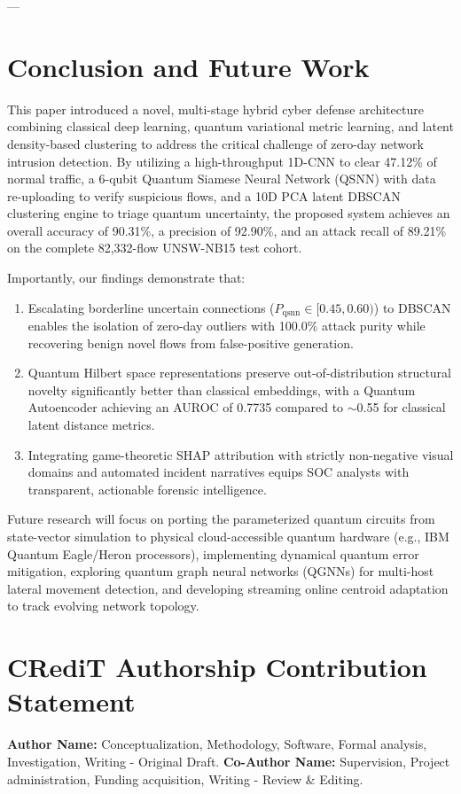 \documentclass[preprint,12pt]{elsarticle}
\begin{document}
---

\section{Conclusion and Future Work}
\label{sec:conclusion}

This paper introduced a novel, multi-stage hybrid cyber defense architecture combining classical deep learning, quantum variational metric learning, and latent density-based clustering to address the critical challenge of zero-day network intrusion detection. By utilizing a high-throughput 1D-CNN to clear 47.12\% of normal traffic, a 6-qubit Quantum Siamese Neural Network (QSNN) with data re-uploading to verify suspicious flows, and a 10D PCA latent DBSCAN clustering engine to triage quantum uncertainty, the proposed system achieves an overall accuracy of 90.31\%, a precision of 92.90\%, and an attack recall of 89.21\% on the complete 82,332-flow UNSW-NB15 test cohort.

Importantly, our findings demonstrate that:
\begin{enumerate}
    \item Escalating borderline uncertain connections ($P_{\text{qsnn}} \in [0.45, 0.60)$) to DBSCAN enables the isolation of zero-day outliers with 100.0\% attack purity while recovering benign novel flows from false-positive generation.
    \item Quantum Hilbert space representations preserve out-of-distribution structural novelty significantly better than classical embeddings, with a Quantum Autoencoder achieving an AUROC of 0.7735 compared to $\sim$0.55 for classical latent distance metrics.
    \item Integrating game-theoretic SHAP attribution with strictly non-negative visual domains and automated incident narratives equips SOC analysts with transparent, actionable forensic intelligence.
\end{enumerate}

Future research will focus on porting the parameterized quantum circuits from state-vector simulation to physical cloud-accessible quantum hardware (e.g., IBM Quantum Eagle/Heron processors), implementing dynamical quantum error mitigation, exploring quantum graph neural networks (QGNNs) for multi-host lateral movement detection, and developing streaming online centroid adaptation to track evolving network topology.

\section*{CRediT Authorship Contribution Statement}
\textbf{Author Name:} Conceptualization, Methodology, Software, Formal analysis, Investigation, Writing - Original Draft. \textbf{Co-Author Name:} Supervision, Project administration, Funding acquisition, Writing - Review \& Editing.
\end{document}
